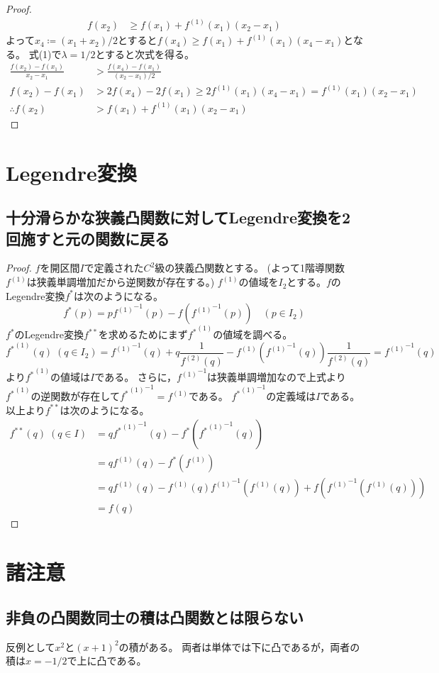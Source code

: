 \begin{proof}
\begin{align*}
                    f(x_2) &\geq f(x_1) + f^{(1)}(x_1)(x_2-x_1)
                \end{align*}
                よって$x_4 \coloneq (x_1 + x_2)/2$とすると$f(x_4) \geq f(x_1) + f^{(1)}(x_1)(x_4-x_1)$となる。
                式(1)で$\lambda=1/2$とすると次式を得る。
                \begin{align*}
                    \frac{f(x_2)-f(x_1)}{x_2-x_1} &> \frac{f(x_4) - f(x_1)}{(x_2-x_1)/2} \\
                    f(x_2)-f(x_1) &> 2f(x_4) - 2f(x_1) \geq 2f^{(1)}(x_1)(x_4-x_1) = f^{(1)}(x_1)(x_2-x_1) \\
                    \therefore f(x_2) &> f(x_1) + f^{(1)}(x_1)(x_2-x_1)
                \end{align*}
            \end{proof}
    \section{Legendre変換}
        \subsection{十分滑らかな狭義凸関数に対してLegendre変換を2回施すと元の関数に戻る}
            \newcommand{\fd}{{f^{(1)}}}
            \newcommand{\fStarD}{{{f^*}^{(1)}}}
            \begin{proof}
                \quad\par
                $f$を開区間$I$で定義された$C^2$級の狭義凸関数とする。
                (よって1階導関数$f^{(1)}$は狭義単調増加だから逆関数が存在する。)
                $\fd$の値域を$I_2$とする。$f$のLegendre変換$f^*$は次のようになる。
                \[ f^*(p) = p\fd^{-1}(p) - f\left(\fd^{-1}(p)\right) \quad (p \in I_2) \]
                $f^*$のLegendre変換$f^{**}$を求めるためにまず${f^*}^{(1)}$の値域を調べる。
                \[ \fStarD(q)\;(q \in I_2) = \fd^{-1}(q) + q\frac{1}{f^{(2)}(q)} - \fd\left(\fd^{-1}(q)\right)\frac{1}{f^{(2)}(q)} = \fd^{-1}(q) \]
                より$\fStarD$の値域は$I$である。
                さらに，$\fd^{-1}$は狭義単調増加なので上式より$\fStarD$の逆関数が存在して$\fStarD^{-1} = \fd$である。
                $\fStarD^{-1}$の定義域は$I$である。
                以上より$f^{**}$は次のようになる。
                \begin{align*}
                    f^{**}(q)\; (q \in I) &= q\fStarD^{-1}(q) - f^*\left(\fStarD^{-1}(q)\right) \\
                    &= q\fd(q) - f^*(\fd) \\
                    &= q\fd(q) - \fd(q)\fd^{-1}\left(\fd(q)\right) + f\left(\fd^{-1}\left(\fd(q)\right)\right) \\
                    &= f(q)
                \end{align*}
            \end{proof}
            \let\fd\undefined
            \let\fStarD\undefined
    \section{諸注意}
        \subsection{非負の凸関数同士の積は凸関数とは限らない}
            反例として$x^2$と$(x+1)^2$の積がある。
            両者は単体では下に凸であるが，両者の積は$x=-1/2$で上に凸である。

